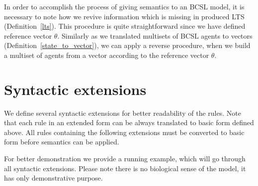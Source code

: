 \documentclass[12pt]{fithesis2}
\begin{document}
In order to accomplish the process of giving semantics to an BCSL model, it is necessary to note how we revive information which is missing in produced LTS (Definition~\ref{lts}). This procedure is quite straightforward since we have defined reference vector $\theta$. Similarly as we translated multisets of BCSL agents to vectors (Definition~\ref{state_to_vector}), we can apply a reverse procedure, when we build a multiset of agents from a vector according to the reference vector $\theta$.

\section{Syntactic extensions}
\label{syntactic_extensions}

We define several syntactic extensions for better readability of the rules. Note that each rule in an extended form can be always translated to basic form defined above. All rules containing the following extensions must be converted to basic form before semantics can be applied.

For better demonstration we provide a running example, which will go through all syntactic extensions. Please note there is no biological sense of the model, it has only demonstrative purpose.
\end{document}
